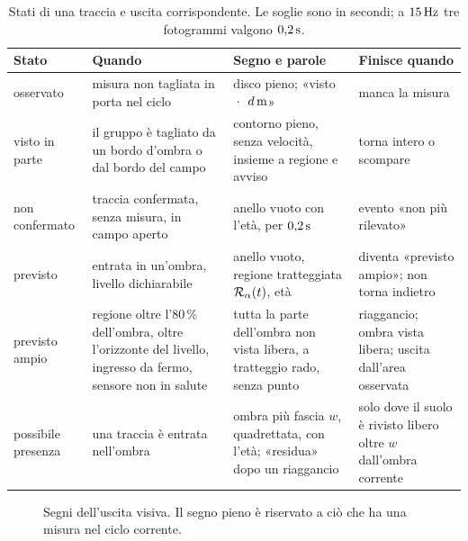 \begin{table}[H]\centering\small
\caption{Stati di una traccia e uscita corrispondente. Le soglie sono in secondi; a $15\unita{Hz}$ tre fotogrammi valgono $0{,}2\unita{s}$.}\label{tab:lim-stati}
\begin{tabularx}{\linewidth}{@{}p{2.5cm}Lp{4.6cm}L@{}}
\toprule
Stato & Quando & Segno e parole & Finisce quando\\
\midrule
osservato & misura non tagliata in porta nel ciclo & disco pieno; «visto · $d\,\mathrm{m}$» & manca la misura\\
visto in parte & il gruppo è tagliato da un bordo d'ombra o dal bordo del campo & contorno pieno, senza velocità, insieme a regione e avviso & torna intero o scompare\\
non confermato & traccia confermata, senza misura, in campo aperto & anello vuoto con l'età, per $0{,}2\unita{s}$ & evento «non più rilevato»\\
previsto & entrata in un'ombra, livello dichiarabile & anello vuoto, regione tratteggiata $\mathcal{R}_\alpha(t)$, età & diventa «previsto ampio»; non torna indietro\\
previsto ampio & regione oltre l'$80\,\%$ dell'ombra, oltre l'orizzonte del livello, ingresso da fermo, sensore non in salute & tutta la parte dell'ombra non vista libera, a tratteggio rado, senza punto & riaggancio; ombra vista libera; uscita dall'area osservata\\
possibile presenza & una traccia è entrata nell'ombra & ombra più fascia $w$, quadrettata, con l'età; «residua» dopo un riaggancio & solo dove il suolo è rivisto libero oltre $w$ dall'ombra corrente\\
\bottomrule
\end{tabularx}
\end{table}

\begin{figure}[H]\centering
{}
\caption{Segni dell'uscita visiva. Il segno pieno è riservato a ciò che ha una misura nel ciclo corrente.}\label{fig:lim-segni}
\end{figure}

